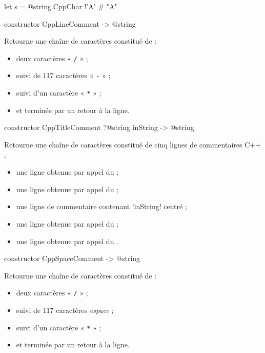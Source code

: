 \begin{galgas4}
let s = @string.CppChar {!'A'} # "A"
\end{galgas4}




\begin{galgas4box}
constructor CppLineComment -> @string
\end{galgas4box}

Retourne une chaîne de caractères constitué de :
\begin{itemize}
  \item deux caractères « \texttt{/} » ;
  \item suivi de 117 caractères « \texttt{-} » ;
  \item suivi d'un caractère « \texttt{*} » ;
  \item et terminée par un retour à la ligne.
\end{itemize}





\begin{galgas4box}
constructor CppTitleComment ?@string inString -> @string
\end{galgas4box}

Retourne une chaîne de caractères constitué de cinq lignes de commentaires C++ :
\begin{itemize}
\item une ligne obtenue par appel du  ;
\item une ligne obtenue par appel du  ;
\item une ligne de commentaire contenant \ggsq!inString! centré ;
\item une ligne obtenue par appel du  ;
\item une ligne obtenue par appel du .
\end{itemize}




\begin{galgas4box}
constructor CppSpaceComment -> @string
\end{galgas4box}

Retourne une chaîne de caractères constitué de :
\begin{itemize}
  \item deux caractères « \texttt{/} » ;
  \item suivi de 117 caractères \emph{espace} ;
  \item suivi d'un caractère « \texttt{*} » ;
  \item et terminée par un retour à la ligne.
\end{itemize}

